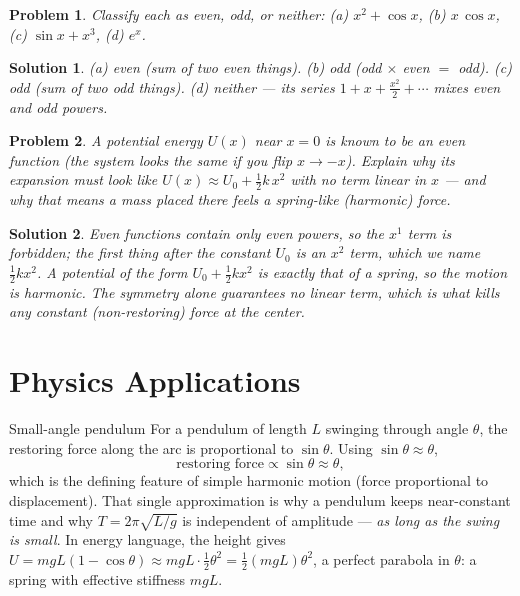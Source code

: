 \documentclass[11pt]{article}
\newcommand{\clearpts}{\addtocounter{tpts}{\value{cpts}} \setcounter{cpts}{0}}
\newcommand{\pts}[1]{\clearpts \setcounter{cpts}{#1}}
\newtheorem*{solution}{Solution}
\theoremstyle{mystyle}
\newtheorem{pproblem}{Problem}
\begin{document}
\pts{4}
\begin{pproblem}
Classify each as even, odd, or neither: (a) $x^2 + \cos x$, \;(b) $x\,\cos x$,
\;(c) $\sin x + x^3$, \;(d) $e^x$.
\end{pproblem}
\begin{solution}
(a) even (sum of two even things). \quad
(b) odd (odd $\times$ even $=$ odd). \quad
(c) odd (sum of two odd things). \quad
(d) neither --- its series $1 + x + \tfrac{x^2}{2}+\cdots$ mixes even and odd powers.
\end{solution}

\pts{3}
\begin{pproblem}
A potential energy $U(x)$ near $x = 0$ is known to be an \emph{even} function (the system
looks the same if you flip $x \to -x$). Explain why its expansion must look like
$U(x) \approx U_0 + \tfrac12 k\,x^2$ with no term linear in $x$ --- and why that means a
mass placed there feels a spring-like (harmonic) force.
\end{pproblem}
\begin{solution}
Even functions contain only even powers, so the $x^1$ term is forbidden; the first thing
after the constant $U_0$ is an $x^2$ term, which we name $\tfrac12 k x^2$. A potential of
the form $U_0 + \tfrac12 k x^2$ is exactly that of a spring, so the motion is harmonic.
The symmetry alone guarantees no linear term, which is what kills any constant
(non-restoring) force at the center.
\end{solution}

\section{Physics Applications}

\begin{psidea}{Small-angle pendulum}{}
For a pendulum of length $L$ swinging through angle $\theta$, the restoring force along
the arc is proportional to $\sin\theta$. Using $\sin\theta \approx \theta$,
\[
\text{restoring force} \propto \sin\theta \approx \theta,
\]
which is the defining feature of simple harmonic motion (force proportional to
displacement). That single approximation is why a pendulum keeps near-constant time and
why $T = 2\pi\sqrt{L/g}$ is independent of amplitude --- \emph{as long as the swing is
small}. In energy language, the height gives
$U = mgL(1-\cos\theta) \approx mgL\cdot\tfrac12\theta^2 = \tfrac12(mgL)\theta^2$,
a perfect parabola in $\theta$: a spring with effective stiffness $mgL$.
\end{psidea}
\end{document}
